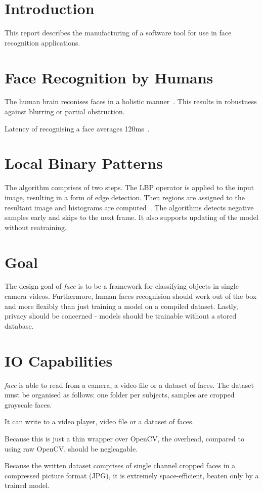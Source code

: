 \documentclass{article}
\title{}
\author{Miroslav Vitkov}
\date{\today}
\newcommand{\face}[0]{\textit{face }}
\newcommand{\para}[0]{\\ \par \noindent}
\begin{document}
\maketitle


\section{Introduction}
This report describes the manufacturing of a software tool for use in face recognition applications.


\section{Face Recognition by Humans}
The human brain reconises faces in a holistic manner~\cite{sinha}.
This results in robustness against blurring or partial obstruction.
\para
Latency of recognising a face averages 120ms~\cite{sinha}.


\section{Local Binary Patterns}
The algorithm comprises of two steps.
The LBP operator is applied to the input image, resulting in a form of edge detection. 
Then regions are assigned to the resultant image and histograms are computed~\cite{ahonen}.
The algorithms detects negative samples early and skips to the next frame.
It also supports updating of the model without reatraining.


\section{Goal}
The design goal of \face is to be a framework for classifying objects in single camera videos.
Furthermore, human faces recognision should work out of the box and more flexibly than just training a model on a compiled dataset.
Lastly, privacy should be concerned - models should be trainable without a stored database.

\section{IO Capabilities}
\face is able to read from a camera, a video file or a dataset of faces.
The dataset must be organised as follows: one folder per subjects, samples are cropped grayscale faces.
\para
It can write to a video player, video file or a dataset of faces.
\para
Because this is just a thin wrapper over OpenCV, the overhead, compared to using raw OpenCV, should be negleagable.
\para
Because the written dataset comprises of single channel cropped faces in a compressed picture format (JPG), it is extremely space-efficient, 
beaten only by a trained model.
\end{document}
